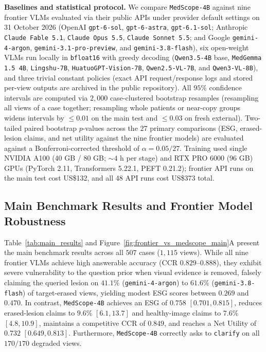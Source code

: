 \documentclass{article} %
\begin{document}
\textbf{Baselines and statistical protocol.} We compare \texttt{MedScope-4B} against nine frontier VLMs evaluated via their public APIs under provider default settings on 31 October 2026 (OpenAI \texttt{gpt-6-sol}, \texttt{gpt-6-astra}, \texttt{gpt-6.1-sol}; Anthropic \texttt{Claude Fable 5.1}, \texttt{Claude Opus 5.5}, \texttt{Claude Sonnet 5.5}; and Google \texttt{gemini-4-argon}, \texttt{gemini-3.1-pro-preview}, and \texttt{gemini-3.8-flash}), six open-weight VLMs run locally in \texttt{bfloat16} with greedy decoding (\texttt{Qwen3.5-4B} base, \texttt{MedGemma 1.5 4B}, \texttt{Lingshu-7B}, \texttt{HuatuoGPT-Vision-7B}, \texttt{Qwen2.5-VL-7B}, and \texttt{Qwen3-VL-8B}), and three trivial constant policies (exact API request/response logs and stored per-view outputs are archived in the public repository). All $95\%$ confidence intervals are computed via $2,000$ case-clustered bootstrap resamples (resampling all views of a case together; resampling whole patients or near-copy groups widens intervals by $\le 0.01$ on the main test and $\le 0.03$ on fresh external). Two-tailed paired bootstrap $p$-values across the $27$ primary comparisons (ESG, erased-lesion claims, and net utility against the nine frontier models) are evaluated against a Bonferroni-corrected threshold of $\alpha = 0.05/27$. Training used single NVIDIA A100 (40 GB / 80 GB; $\sim 4\text{ h}$ per stage) and RTX PRO 6000 (96 GB) GPUs (PyTorch 2.11, Transformers 5.22.1, PEFT 0.21.2); frontier API runs on the main test cost US\$132, and all 48 API runs cost US\$373 total.

\subsection{Main Benchmark Results and Frontier Model Robustness}
\label{subsec:exp_main}
Table~\ref{tab:main_results} and Figure~\ref{fig:frontier_vs_medscope_main}A present the main benchmark results across all $507$ cases ($1,115$ views). While all nine frontier VLMs achieve high answerable accuracy ($\text{CCR } 0.829\text{--}0.888$), they exhibit severe vulnerability to the question prior when visual evidence is removed, falsely claiming the queried lesion on $41.1\%$ (\texttt{gemini-4-argon}) to $61.6\%$ (\texttt{gemini-3.8-flash}) of target-erased views, yielding modest ESG scores between $0.269$ and $0.470$. In contrast, \texttt{MedScope-4B} achieves an ESG of $0.758$ $[0.701, 0.815]$, reduces erased-lesion claims to $9.6\%$ $[6.1, 13.7]$ and healthy-image claims to $7.6\%$ $[4.8, 10.9]$, maintains a competitive CCR of $0.849$, and reaches a Net Utility of $0.732$ $[0.649, 0.813]$. Furthermore, \texttt{MedScope-4B} correctly asks to \texttt{clarify} on all $170/170$ degraded views.
\end{document}
